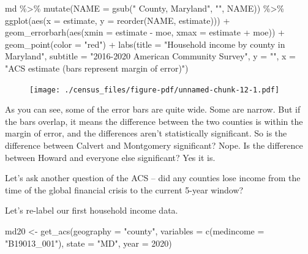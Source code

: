 \documentclass[
  letterpaper,
  DIV=11,
  numbers=noendperiod]{scrreprt}
\newenvironment{Shaded}{\begin{snugshade}}{\end{snugshade}}
\newcommand{\AttributeTok}[1]{\textcolor[rgb]{0.40,0.45,0.13}{#1}}
\newcommand{\DecValTok}[1]{\textcolor[rgb]{0.68,0.00,0.00}{#1}}
\newcommand{\FunctionTok}[1]{\textcolor[rgb]{0.28,0.35,0.67}{#1}}
\newcommand{\NormalTok}[1]{\textcolor[rgb]{0.00,0.23,0.31}{#1}}
\newcommand{\OtherTok}[1]{\textcolor[rgb]{0.00,0.23,0.31}{#1}}
\newcommand{\SpecialCharTok}[1]{\textcolor[rgb]{0.37,0.37,0.37}{#1}}
\newcommand{\StringTok}[1]{\textcolor[rgb]{0.13,0.47,0.30}{#1}}
\begin{document}
\begin{Shaded}
\begin{Highlighting}[]
\NormalTok{md }\SpecialCharTok{\%\textgreater{}\%}
  \FunctionTok{mutate}\NormalTok{(}\AttributeTok{NAME =} \FunctionTok{gsub}\NormalTok{(}\StringTok{" County, Maryland"}\NormalTok{, }\StringTok{""}\NormalTok{, NAME)) }\SpecialCharTok{\%\textgreater{}\%}
  \FunctionTok{ggplot}\NormalTok{(}\FunctionTok{aes}\NormalTok{(}\AttributeTok{x =}\NormalTok{ estimate, }\AttributeTok{y =} \FunctionTok{reorder}\NormalTok{(NAME, estimate))) }\SpecialCharTok{+}
  \FunctionTok{geom\_errorbarh}\NormalTok{(}\FunctionTok{aes}\NormalTok{(}\AttributeTok{xmin =}\NormalTok{ estimate }\SpecialCharTok{{-}}\NormalTok{ moe, }\AttributeTok{xmax =}\NormalTok{ estimate }\SpecialCharTok{+}\NormalTok{ moe)) }\SpecialCharTok{+}
  \FunctionTok{geom\_point}\NormalTok{(}\AttributeTok{color =} \StringTok{"red"}\NormalTok{) }\SpecialCharTok{+}
  \FunctionTok{labs}\NormalTok{(}\AttributeTok{title =} \StringTok{"Household income by county in Maryland"}\NormalTok{,}
       \AttributeTok{subtitle =} \StringTok{"2016{-}2020 American Community Survey"}\NormalTok{,}
       \AttributeTok{y =} \StringTok{""}\NormalTok{,}
       \AttributeTok{x =} \StringTok{"ACS estimate (bars represent margin of error)"}\NormalTok{)}
\end{Highlighting}
\end{Shaded}

\begin{figure}[H]

{\centering \texttt{[image: ./census\_files/figure-pdf/unnamed-chunk-12-1.pdf]}

}

\end{figure}

As you can see, some of the error bars are quite wide. Some are narrow.
But if the bars overlap, it means the difference between the two
counties is within the margin of error, and the differences aren't
statistically significant. So is the difference between Calvert and
Montgomery significant? Nope. Is the difference between Howard and
everyone else significant? Yes it is.

Let's ask another question of the ACS -- did any counties lose income
from the time of the global financial crisis to the current 5-year
window?

Let's re-label our first household income data.

\begin{Shaded}
\begin{Highlighting}[]
\NormalTok{md20 }\OtherTok{\textless{}{-}} \FunctionTok{get\_acs}\NormalTok{(}\AttributeTok{geography =} \StringTok{"county"}\NormalTok{,}
              \AttributeTok{variables =} \FunctionTok{c}\NormalTok{(}\AttributeTok{medincome =} \StringTok{"B19013\_001"}\NormalTok{),}
              \AttributeTok{state =} \StringTok{"MD"}\NormalTok{,}
              \AttributeTok{year =} \DecValTok{2020}\NormalTok{)}
\end{Highlighting}
\end{Shaded}
\end{document}
